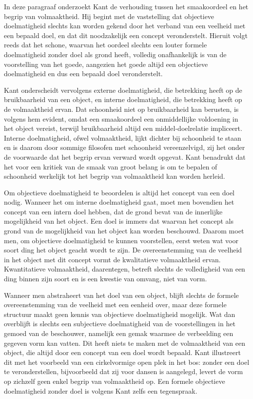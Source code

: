 \begin{mdframed}[leftmargin=0pt,rightmargin=0pt,backgroundcolor=blue!6,linecolor=white,innertopmargin=6pt,innerbottommargin=6pt]

In deze paragraaf onderzoekt Kant de verhouding tussen het smaakoordeel en het begrip van volmaaktheid. Hij begint met de vaststelling dat objectieve doelmatigheid slechts kan worden gekend door het verband van een veelheid met een bepaald doel, en dat dit noodzakelijk een concept veronderstelt. Hieruit volgt reeds dat het schone, waarvan het oordeel slechts een louter formele doelmatigheid zonder doel als grond heeft, volledig onafhankelijk is van de voorstelling van het goede, aangezien het goede altijd een objectieve doelmatigheid en dus een bepaald doel veronderstelt.

Kant onderscheidt vervolgens externe doelmatigheid, die betrekking heeft op de bruikbaarheid van een object, en interne doelmatigheid, die betrekking heeft op de volmaaktheid ervan. Dat schoonheid niet op bruikbaarheid kan berusten, is volgens hem evident, omdat een smaakoordeel een onmiddellijke voldoening in het object vereist, terwijl bruikbaarheid altijd een middel-doelrelatie impliceert. Interne doelmatigheid, ofwel volmaaktheid, lijkt dichter bij schoonheid te staan en is daarom door sommige filosofen met schoonheid vereenzelvigd, zij het onder de voorwaarde dat het begrip ervan verward wordt opgevat. Kant benadrukt dat het voor een kritiek van de smaak van groot belang is om te bepalen of schoonheid werkelijk tot het begrip van volmaaktheid kan worden herleid.

Om objectieve doelmatigheid te beoordelen is altijd het concept van een doel nodig. Wanneer het om interne doelmatigheid gaat, moet men bovendien het concept van een intern doel hebben, dat de grond bevat van de innerlijke mogelijkheid van het object. Een doel is immers dat waarvan het concept als grond van de mogelijkheid van het object kan worden beschouwd. Daarom moet men, om objectieve doelmatigheid te kunnen voorstellen, eerst weten wat voor soort ding het object geacht wordt te zijn. De overeenstemming van de veelheid in het object met dit concept vormt de kwalitatieve volmaaktheid ervan. Kwantitatieve volmaaktheid, daarentegen, betreft slechts de volledigheid van een ding binnen zijn soort en is een kwestie van omvang, niet van vorm.

Wanneer men abstraheert van het doel van een object, blijft slechts de formele overeenstemming van de veelheid met een eenheid over, maar deze formele structuur maakt geen kennis van objectieve doelmatigheid mogelijk. Wat dan overblijft is slechts een subjectieve doelmatigheid van de voorstellingen in het gemoed van de beschouwer, namelijk een gemak waarmee de verbeelding een gegeven vorm kan vatten. Dit heeft niets te maken met de volmaaktheid van een object, die altijd door een concept van een doel wordt bepaald. Kant illustreert dit met het voorbeeld van een cirkelvormige open plek in het bos: zonder een doel te veronderstellen, bijvoorbeeld dat zij voor dansen is aangelegd, levert de vorm op zichzelf geen enkel begrip van volmaaktheid op. Een formele objectieve doelmatigheid zonder doel is volgens Kant zelfs een tegenspraak.


\end{mdframed}
